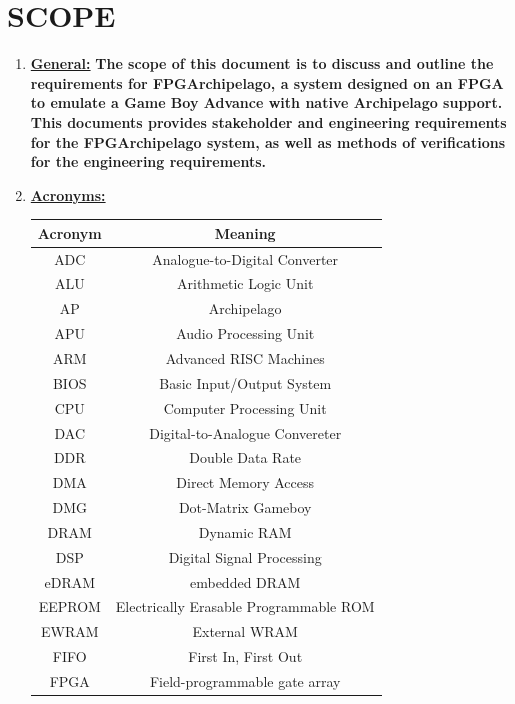 \section{SCOPE}


\begin{enumerate}
	\item [(a)]\textbf{\underline{General:}} \textbf{The scope of this document is to discuss and outline the requirements for FPGArchipelago, a system designed on an FPGA to emulate a Game Boy Advance with native Archipelago support. This documents provides stakeholder and engineering requirements for the FPGArchipelago system, as well as methods of verifications for the engineering requirements.}
\bigskip


	\item [(b)] \textbf{\underline{Acronyms:}} {
		\begin{table}[ht]
			\centering
			\begin{tabular}{|c|c|}
				\hline
				\textbf{Acronym} & \textbf{Meaning} \\
				\hline
				ADC & Analogue-to-Digital Converter \\
				\hline
				ALU & Arithmetic Logic Unit \\
				\hline
				AP & Archipelago \\
				\hline
				APU & Audio Processing Unit \\
				\hline
				ARM & Advanced RISC Machines \\
				\hline
				BIOS & Basic Input/Output System \\
				\hline
				CPU & Computer Processing Unit \\
				\hline
				DAC & Digital-to-Analogue Convereter \\
				\hline
				DDR & Double Data Rate \\
				\hline
				DMA& Direct Memory Access \\
				\hline
				DMG & Dot-Matrix Gameboy \\
				\hline
				DRAM & Dynamic RAM \\
				\hline
				DSP & Digital Signal Processing \\
				\hline
				eDRAM & embedded DRAM \\
				\hline
				EEPROM & Electrically Erasable Programmable ROM \\
				\hline
				EWRAM & External WRAM \\
				\hline
				FIFO & First In, First Out \\
				\hline
				FPGA & Field-programmable gate array \\

\end{tabular}
\end{table}}
\end{enumerate}
